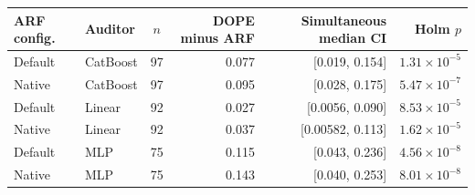 \begin{tabular}{@{}llcrrr@{}}
\toprule
ARF config. & Auditor & $n$ & DOPE minus ARF & Simultaneous median CI & Holm $p$ \\
\midrule
Default & CatBoost & 97 & 0.077 & [0.019, 0.154] & $1.31\times 10^{-5}$ \\
Native & CatBoost & 97 & 0.095 & [0.028, 0.175] & $5.47\times 10^{-7}$ \\
Default & Linear & 92 & 0.027 & [0.0056, 0.090] & $8.53\times 10^{-5}$ \\
Native & Linear & 92 & 0.037 & [0.00582, 0.113] & $1.62\times 10^{-5}$ \\
Default & MLP & 75 & 0.115 & [0.043, 0.236] & $4.56\times 10^{-8}$ \\
Native & MLP & 75 & 0.143 & [0.040, 0.253] & $8.01\times 10^{-8}$ \\
\bottomrule
\end{tabular}
